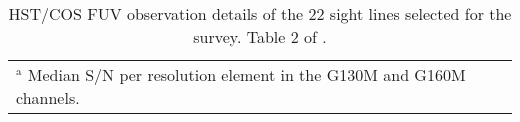 \begin{table}
\begin{tabular}{cccccc}
           \tabularnewline \hline \hline 
            \multicolumn{6}{l}{\footnotesize{$^\text{a}$ Median S/N per resolution element in the G130M and G160M channels.}}

    \end{tabular}
\caption{HST/COS FUV observation details of the 22 sight lines selected for the survey. Table 2 of \citet{danforth-2016}.}
\label{tab:LOS-COS-observations}
\end{table}


